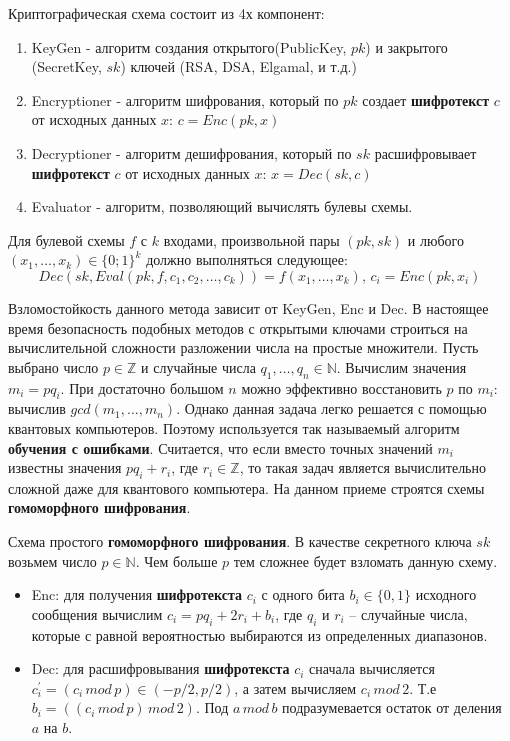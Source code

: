 Криптографическая схема состоит из 4х компонент:
\begin{enumerate}
	\item KeyGen - алгоритм создания открытого(PublicKey, $pk$) и закрытого (SecretKey, $sk$) ключей (RSA, DSA, Elgamal, и т.д.)
	\item Encryptioner - алгоритм шифрования, который по $pk$ создает \textbf{шифротекст} $c$ от исходных данных $x$: $c = Enc(pk, x)$
	\item Decryptioner - алгоритм дешифрования, который по $sk$ расшифровывает \textbf{шифротекст} $c$ от исходных данных $x$: $x = Dec(sk, c)$
	\item Evaluator - алгоритм, позволяющий вычислять булевы схемы.
\end{enumerate} 

Для булевой схемы $f$ с $k$ входами, произвольной пары $(pk, sk)$ и любого $(x_1, \dots, x_k) \in \{0;1\}^k$ должно выполняться следующее: $$Dec(sk, Eval(pk, f, c_1,c_2, \dots, c_k)) = f(x_1, \dots, x_k), \, c_i = Enc(pk, x_i)$$


Взломостойкость данного метода зависит от KeyGen, Enc и Dec. В настоящее время безопасность подобных методов с открытыми ключами строиться на вычислительной сложности разложении числа на простые множители. Пусть выбрано число $p \in \mathbb{Z}$ и случайные числа $q_1, \dots, q_n \in \mathbb{N}$. Вычислим значения $m_i=pq_i$. При достаточно большом $n$ можно эффективно восстановить $p$ по $m_i$: вычислив $gcd(m_1, \dots, m_n)$.  Однако данная задача легко решается с помощью квантовых компьютеров. Поэтому используется так называемый алгоритм \textbf{обучения с ошибками}. Считается, что если вместо точных значений $m_i$ известны значения $pq_i+r_i$, где $r_i \in \mathbb{Z}$, то такая задач является вычислительно сложной даже для квантового компьютера. На данном приеме строятся схемы \textbf{гомоморфного шифрования}.

Схема простого \textbf{гомоморфного шифрования}. В качестве секретного ключа $sk$ возьмем число $p \in \mathbb{N}$. Чем больше $p$ тем сложнее будет взломать данную схему.
\begin{itemize}
	\item Enc: для получения \textbf{шифротекста} $c_i$ с одного бита $b_i \in \{0, 1\}$ исходного сообщения вычислим $c_i = pq_i + 2r_i + b_i$, где $q_i$ и $r_i$ -- случайные числа, которые с равной вероятностью выбираются из определенных диапазонов.
	\item Dec: для расшифровывания \textbf{шифротекста} $c_i$ сначала вычисляется $c_i^{'} = (c_i \, mod \, p) \in (-p/2, p/2)$, а затем вычисляем $c_i \, mod \, 2$. Т.е $b_i = ((c_i \, mod \, p) \, mod \, 2)$. Под $a \, mod \, b $ подразумевается остаток от деления $a$ на $b$.
\end{itemize}

